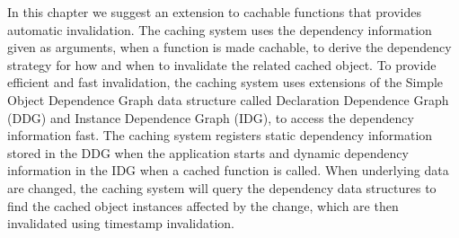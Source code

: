 In this chapter we suggest an extension to cachable functions that provides automatic invalidation. The caching system uses the dependency information given as arguments, when a function is made cachable, to derive the dependency strategy for how and when to invalidate the related cached object. To provide efficient and fast invalidation, the caching system uses extensions of the Simple Object Dependence Graph data structure called Declaration Dependence Graph (DDG) and Instance Dependence Graph (IDG), to access the dependency information fast.
The caching system registers static dependency information stored in the DDG when the application starts and dynamic dependency information in the IDG when a cached function is called.
When underlying data are changed, the caching system will query the dependency data structures to find the cached object instances affected by the change, which are then invalidated using timestamp invalidation.



